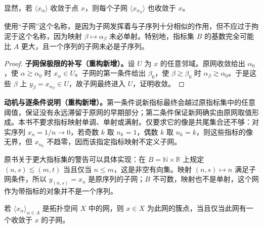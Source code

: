 \documentclass[../../main.tex]{subfiles}%
\begin{document}
\begin{proposition}\label{proposition:ch04-subnet-limit}
显然，若 $\langle x_\alpha\rangle$ 收敛于点 $x$，则每个子网 $\langle x_{\alpha_\beta}\rangle$ 也收敛于 $x$。
\end{proposition}
\begin{remark}
使用“子网”这个名称，是因为子网发挥着与子序列十分相似的作用，但不应过于拘泥于这个名称，因为映射 $\beta\mapsto\alpha_\beta$ 未必单射。特别地，指标集 $B$ 的基数完全可能比 $A$ 更大，且一个序列的子网未必是子序列。
\end{remark}
\begin{proof}
\textbf{子网保极限的补写（重构新增）。}设 $U$ 为 $x$ 的任意邻域。原网收敛给出 $\alpha_0$，使 $\alpha\gtrsim\alpha_0$ 时 $x_\alpha\in U$。子网的第一条件给出 $\beta_0$，使 $\beta\gtrsim\beta_0$ 时 $\alpha_\beta\gtrsim\alpha_0$。于是这些 $\beta$ 上 $y_\beta=x_{\alpha_\beta}\in U$，故子网最终进入 $U$，证明收敛。
\end{proof}
\begin{remark}
\textbf{动机与逐条件说明（重构新增）。}第一条件说新指标最终会越过原指标集中的任意阈值，保证没有永远滞留于原网的早期部分；第二条件保证新网确实由原网取值形成。本书不要求指标映射单调、单射或满射。仅要求它的像是共尾集合还不够：对实序列 $x_n=1/n\to0$，若奇数 $k$ 取 $n_k=1$，偶数 $k$ 取 $n_k=k$，则这些指标的像无界，但 $x_{n_k}$ 不趋零，因而该指定指标映射不定义子网。

原书关于更大指标集的警告可以具体实现：在 $B=\mathbb N\times\mathbb R$ 上规定 $(n,s)\lesssim(m,t)$ 当且仅当 $n\le m$，这是非空有向集。映射 $(n,s)\mapsto n$ 满足子网条件，所以 $y_{(n,s)}=x_n$ 是原序列的子网；$B$ 不可数，映射也不是单射，这个网作为带指标的对象并不是一个序列。
\end{remark}
\begin{proposition}\label{proposition:ch04-cluster-subnet}
若 $\langle x_\alpha\rangle_{\alpha\in A}$ 是拓扑空间 $X$ 中的网，则 $x\in X$ 为此网的簇点，当且仅当此网有一个收敛于 $x$ 的子网。
\end{proposition}
\end{document}
